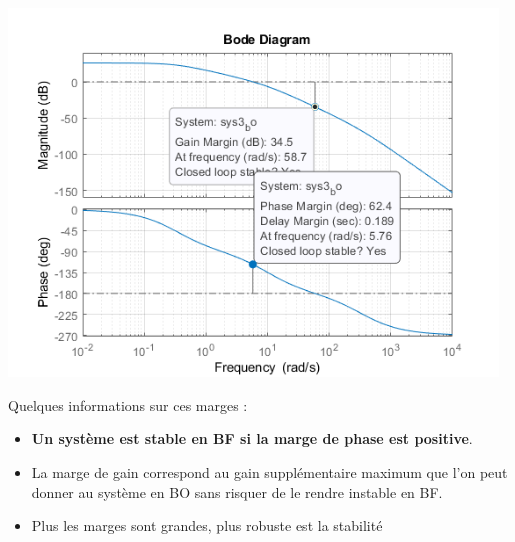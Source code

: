 \documentclass[a4paper,french]{paper}
\begin{document}
\begin{center}
	\includegraphics[width=13cm]{images/TD/sys_stable_corr.png}
\end{center}

Quelques informations sur ces marges :
\begin{itemize}
	\item \textbf{Un système est stable en BF si la marge de phase est positive}.
	\item La marge de gain correspond au gain supplémentaire maximum que l'on peut donner au système en BO sans risquer de le rendre instable en BF.
	\item Plus les marges sont grandes, plus robuste est la stabilité
\end{itemize}

\newpage
\end{document}
